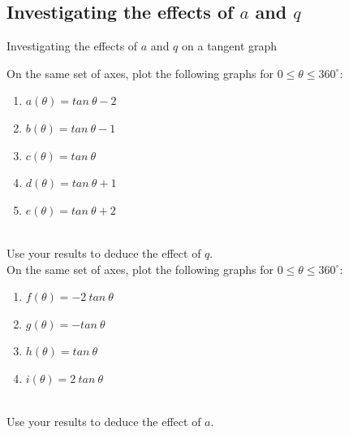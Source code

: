        

\subsection*{Investigating the effects of $a$ and $q$}
\begin{Investigation}{Investigating the effects of $a$ and $q$ on a tangent graph}
{
On the same set of axes, plot the following graphs for $0\leq\theta\leq360^{\circ}$:
\begin{enumerate}[noitemsep, label=\textbf{\arabic*}. ] 
\item $a(\theta )=tan~\theta -2$
\item $b(\theta )=tan~\theta -1$
\item $c(\theta )=tan~\theta $
\item $d(\theta )=tan~\theta +1$
\item $e(\theta )=tan~\theta +2$\end{enumerate}
\\
Use your results to deduce the effect of $q$.\\
 On the same set of axes, plot the following graphs for $0\leq\theta\leq360^{\circ}$:
\begin{enumerate}[noitemsep, label=\textbf{\arabic*}. ] 
\item $f(\theta )=-2~tan~\theta $
\item $g(\theta )=-tan~\theta $
\item $h(\theta )=tan~\theta $
\item $i(\theta )=2~tan~\theta $\end{enumerate}\\
Use your results to deduce the effect of $a$.
}
\end{Investigation}


